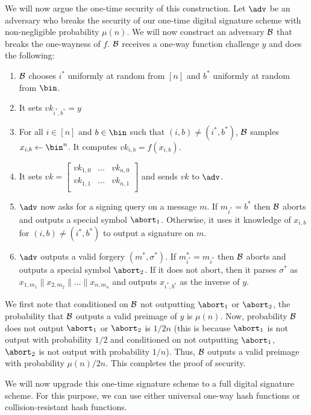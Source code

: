 We will now argue the one-time security of this construction. Let $\adv$ be an adversary who breaks the security of our one-time digital signature scheme with non-negligible probability $\mu(n)$. We will now construct an adversary $\mathcal{B}$ that breaks the one-wayness of $f$. $\mathcal{B}$ receives a one-way function challenge $y$ and does the following:
\begin{enumerate}
    \item $\mathcal{B}$ chooses $i^*$ uniformly at random from $[n]$ and $b^*$ uniformly at random from $\bin$.
    \item It sets $vk_{i^*,b^*} = y$
    \item For all $i \in [n]$ and $b \in \bin$ such that $(i,b) \neq (i^*,b^*)$, $\mathcal{B}$ samples $x_{i,b} \gets \bin^n$. It computes $vk_{i,b} = f(x_{i,b})$.
    \item It sets $vk = \left[ \begin{array}{ccc}
vk_{1,0} & \ldots& vk_{n,0} \\
vk_{1,1} & \ldots& vk_{n,1} \\
\end{array} \right]$ and sends $vk$ to $\adv$.
\item $\adv$ now asks for a signing query on a message $m$. If $m_{i^*} = b^*$ then $\mathcal{B}$ aborts and outputs a special symbol $\abort_1$. Otherwise, it uses it knowledge of $x_{i,b}$ for $(i,b) \neq (i^*,b^*)$ to output a signature on $m$.
\item $\adv$ outputs a valid forgery $(m^*,\sigma^*)$. If $m^*_{i^*} = m_{i^*}$ then $\mathcal{B}$ aborts and outputs a special symbol $\abort_2$. If it does not abort, then it parses $\sigma^*$ as $x_{1,m_1}\|x_{2,m_2}\| \ldots \| x_{n,m_n}$ and outputs $x_{i^*,b^*}$ as the inverse of $y$.
\end{enumerate}
We first note that conditioned on $\mathcal{B}$ not outputting $\abort_1$ or $\abort_2$, the probability that $\mathcal{B}$ outputs a valid preimage of $y$ is $\mu(n)$. Now, probability $\mathcal{B}$ does not output $\abort_1$ or $\abort_2$ is $1/2n$ (this is because $\abort_1$ is not output with probability $1/2$ and conditioned on not outputting $\abort_1$, $\abort_2$ is not output with probability $1/n$). Thus, $\mathcal{B}$ outputs a valid preimage with probability $\mu(n)/2n$. This completes the proof of security.

We will now upgrade this one-time signature scheme to a full digital signature scheme. For this purpose, we can use either universal one-way hash functions or collision-resistant hash functions.

